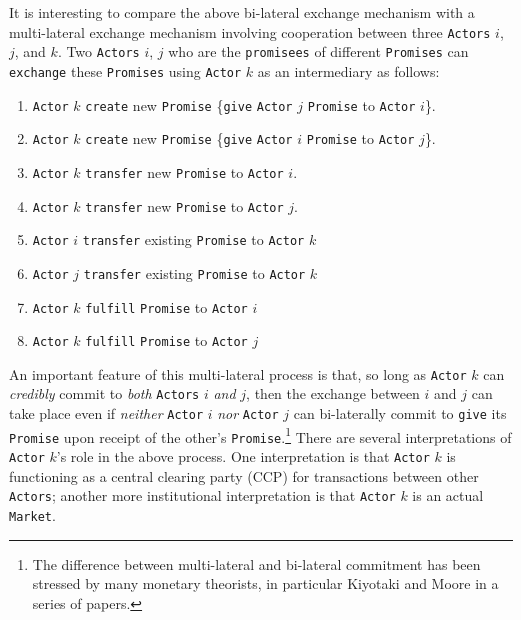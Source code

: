 \documentclass[a4paper]{article}
\begin{document}
It is interesting to compare the above bi-lateral exchange mechanism with a multi-lateral exchange mechanism involving cooperation between three \texttt{Actors} $i$, $j$, and $k$. Two \texttt{Actors} $i$, $j$ who are the \texttt{promisees} of different \texttt{Promises} can \texttt{exchange} these \texttt{Promises} using \texttt{Actor} $k$ as an intermediary as follows:
\begin{enumerate}
	\item \texttt{Actor} $k$ \texttt{create} new \texttt{Promise} \{\texttt{give} \texttt{Actor} $j$ \texttt{Promise} to \texttt{Actor} $i$\}.
	\item \texttt{Actor} $k$ \texttt{create} new \texttt{Promise} \{\texttt{give} \texttt{Actor} $i$ \texttt{Promise} to \texttt{Actor} $j$\}.
	\item \texttt{Actor} $k$ \texttt{transfer} new \texttt{Promise} to \texttt{Actor} $i$.
	\item \texttt{Actor} $k$ \texttt{transfer} new \texttt{Promise} to \texttt{Actor} $j$.
	\item \texttt{Actor} $i$ \texttt{transfer} existing \texttt{Promise} to \texttt{Actor} $k$
	\item \texttt{Actor} $j$ \texttt{transfer} existing \texttt{Promise} to \texttt{Actor} $k$
	\item \texttt{Actor} $k$ \texttt{fulfill} \texttt{Promise} to \texttt{Actor} $i$
	\item \texttt{Actor} $k$ \texttt{fulfill} \texttt{Promise} to \texttt{Actor} $j$
\end{enumerate}
An important feature of this multi-lateral process is that, so long as \texttt{Actor} $k$ can \textit{credibly} commit to \textit{both} \texttt{Actors} $i$ \textit{and} $j$, then the exchange between $i$ and $j$ can take place even if \textit{neither} \texttt{Actor} $i$ \textit{nor} \texttt{Actor} $j$ can bi-laterally commit to \texttt{give} its \texttt{Promise} upon receipt of the other's \texttt{Promise}.\footnote{
%
The difference between multi-lateral and bi-lateral commitment has been stressed by many monetary theorists, in particular Kiyotaki and Moore in a series of papers.
%
}
There are several interpretations of \texttt{Actor} $k$'s role in the above process.  One interpretation is that \texttt{Actor} $k$ is functioning as a central clearing party (CCP) for transactions between other \texttt{Actors}; another more institutional interpretation is that \texttt{Actor} $k$ is an actual \texttt{Market}.
\end{document}
